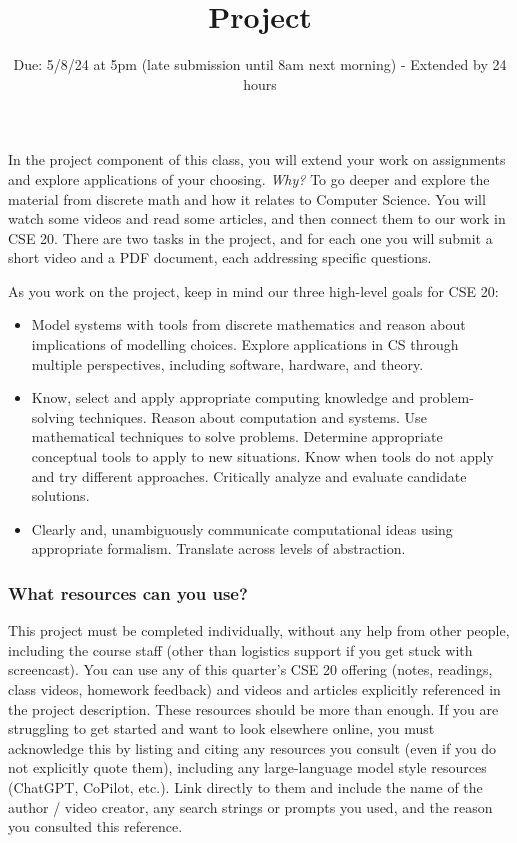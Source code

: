 \newpage

\setlength{\parindent}{0em}
\setlength{\parskip}{0em}

\title{Project}
\date{Due: 5/8/24 at 5pm (late submission until 8am next morning) - Extended by 24 hours}


\maketitle
\thispagestyle{fancy}

\vspace{-20pt}

In the project component of this class, you will extend your 
work on assignments and explore applications of your choosing. 
{\it Why?}
To go deeper and explore the material from discrete math and how it relates to Computer Science.
You will watch some videos and read some articles, and then connect them to our work in CSE 20. There 
are two tasks in the project, and for each one you will submit a short video and a PDF document, each 
addressing specific questions.


As you work on the project, keep in mind our three high-level goals for CSE 20:
\begin{itemize}
\item Model systems with tools from discrete mathematics and reason about implications 
of modelling choices. Explore applications in CS through multiple perspectives, including software, hardware, and theory.
\item Know, select and apply appropriate computing knowledge and problem-solving techniques. Reason about computation and systems. Use mathematical techniques to solve problems. Determine appropriate conceptual tools to apply to new situations. Know when tools do not apply and try different approaches. Critically analyze and evaluate candidate solutions.
\item Clearly and, unambiguously communicate computational ideas using appropriate formalism. Translate across levels of abstraction.
\end{itemize}


\subsubsection*{What resources can you use?} This project must be completed individually, 
without any help from other people, including the course staff (other than logistics support if 
you get stuck with screencast).
You can use any of this quarter's CSE 20 offering (notes, readings, class videos, homework feedback)
and videos and articles explicitly referenced in the project description. 
These resources should be more than enough.
If you are struggling to get started and want to look elsewhere online, 
you must acknowledge this by listing and citing any resources you consult 
(even if you do not explicitly quote them), including any large-language model style resources (ChatGPT, CoPilot, etc.). 
Link directly to them and include the name of the author / video creator, 
any search strings or prompts you used, and the reason you consulted this reference.

